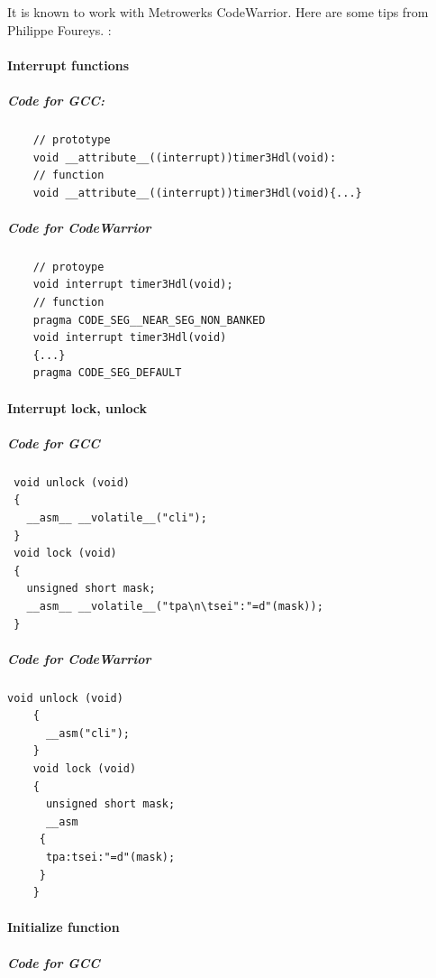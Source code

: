 \documentclass[12pt,english,a4paper]{book}
\begin{document}
It is known to work with Metrowerks CodeWarrior. Here are some tips
from Philippe Foureys. :


\paragraph{Interrupt functions}


\subparagraph{Code for GCC:
}


\begin{verbatim}
	// prototype
	void __attribute__((interrupt))timer3Hdl(void):
	// function
	void __attribute__((interrupt))timer3Hdl(void){...}
\end{verbatim}

	
\subparagraph{Code for CodeWarrior
}


\begin{verbatim}
	// protoype
	void interrupt timer3Hdl(void);
	// function
	pragma CODE_SEG__NEAR_SEG_NON_BANKED
	void interrupt timer3Hdl(void)
	{...}
	pragma CODE_SEG_DEFAULT\end{verbatim}


\paragraph{Interrupt lock, unlock
}


\subparagraph{Code for GCC
}


\begin{verbatim}
 void unlock (void)
 {
   __asm__ __volatile__("cli");
 }
 void lock (void)
 {
   unsigned short mask;
   __asm__ __volatile__("tpa\n\tsei":"=d"(mask));
 }
\end{verbatim}


\subparagraph{Code for CodeWarrior}


\begin{verbatim}
void unlock (void)
	{
	  __asm("cli");
	}
	void lock (void)
	{
	  unsigned short mask;
	  __asm
	 {
	  tpa:tsei:"=d"(mask);
	 }
	}
\end{verbatim}


\paragraph{Initialize function}


\subparagraph{Code for GCC}
\end{document}

